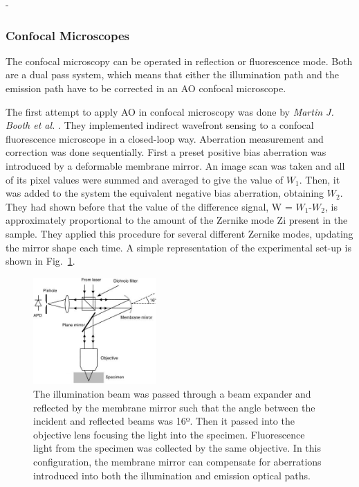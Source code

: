 -
\subsubsection{Confocal Microscopes}
\label{sec:ConfocalMicroscopes}

The confocal microscopy can be operated in reflection or fluorescence mode. Both are a dual pass system, which means that either the illumination path and the emission path have to be corrected in an AO confocal microscope. 

The first attempt to apply AO in confocal microscopy was done by \textit{Martin J. Booth et al.} \cite{scan_CFM}. They implemented indirect wavefront sensing to a confocal fluorescence microscope in a closed-loop way. Aberration measurement and correction was done sequentially. First a preset positive bias aberration was introduced by a deformable membrane mirror. An image scan was taken and all of its pixel values were summed and averaged to give the value of $W_1$. Then, it was added to the system the equivalent negative bias aberration, obtaining $W_2$. They had shown before that the value of the difference signal, W = $W_1$-$W_2$, is approximately proportional to the amount of the Zernike mode Zi present in the sample. They applied this procedure for several different Zernike modes, updating the mirror shape each time. A simple representation of the experimental set-up is shown in Fig.~\ref{fig:AOM_scan_CFM}.

\begin{figure}[htbp]
	\centering
		\includegraphics[width=0.42\textwidth,height=0.22\textheight]{images/AOM_scan_CFM.jpg}
		\caption{The illumination beam was passed through a beam expander and reflected by the membrane mirror such that the angle between the incident and reflected beams was 16º. Then it passed into the objective lens focusing the light into the specimen. Fluorescence light from the specimen was collected by the same objective. In this configuration, the membrane mirror can compensate for aberrations introduced into both the illumination and emission optical paths.}
	\label{fig:AOM_scan_CFM}
\end{figure}
  
